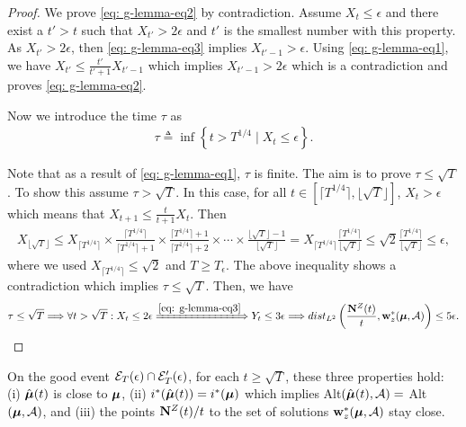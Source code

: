 \begin{proof}
        We prove \eqref{eq: g-lemma-eq2} by contradiction. Assume $X_t \leq \epsilon$ and there exist a $t' > t$ such that $X_{t'} > 2 \epsilon$ and $t'$ is the smallest number with this property. As $X_{t'} > 2 \epsilon$, then \eqref{eq: g-lemma-eq3} implies $X_{t'-1} > \epsilon$. Using \eqref{eq: g-lemma-eq1}, we have $X_{t'} \leq \frac{t'}{t'+1} X_{t'-1}$ which implies $X_{t'-1} > 2 \epsilon$ which is a contradiction and proves \eqref{eq: g-lemma-eq2}. 
    
        Now we introduce the time $\tau$ as 
        \begin{align*}
            \tau \triangleq \inf \left\{ t > T^{1/4} \mid X_t \leq \epsilon \right \}. 
        \end{align*}
    
        Note that as a result of \ref{eq: g-lemma-eq1}, $\tau$ is finite. The aim is to prove $\tau \leq \sqrt{T}$. To show this assume $\tau > \sqrt{T}$. In this case, for all $t \in [\lceil T^{1/4} \rceil , \lfloor \sqrt{T} \rfloor]$, $X_t > \epsilon$ which means that $X_{t+1} \leq \frac{t}{t+1} X_t$. Then 
        \begin{align*}
            X_{\lfloor \sqrt{T} \rfloor} \leq  X_{\lceil T^{1/4} \rceil} \times \frac{\lceil T^{1/4} \rceil}{\lceil T^{1/4} \rceil + 1} \times \frac{\lceil T^{1/4} \rceil + 1}{\lceil T^{1/4} \rceil + 2} \times \cdots \times \frac{\lfloor \sqrt{T} \rfloor - 1}{\lfloor \sqrt{T} \rfloor} = X_{\lceil T^{1/4} \rceil} \frac{\lceil T^{1/4} \rceil}{\lfloor \sqrt{T} \rfloor} \leq \sqrt{2} \frac{\lceil T^{1/4} \rceil}{\lfloor \sqrt{T} \rfloor} \leq \epsilon,
        \end{align*}
        where we used $X_{\lceil T^{1/4} \rceil} \leq \sqrt{2}$ and $T \geq T_{\epsilon}$. The above inequality shows a contradiction which implies $\tau \leq \sqrt{T}$. Then, we have
        \begin{align*}
            \tau \leq \sqrt{T} \Longrightarrow \forall t> \sqrt{T}: X_t \leq 2 \epsilon \xLongrightarrow{\eqref{eq: g-lemma-eq3}}  Y_t \leq 3 \epsilon \Longrightarrow \dls{\frac{\Nb^{Z}(t)}{t}} {\wzstar{\bmu}} \leq 5 \epsilon. 
        \end{align*}
    
    \end{proof}
    

    On the good event $\mathcal{E}_T(\epsilon) \cap \mathcal{E}'_T(\epsilon)$, for each $t \geq \sqrt{T}$, these three properties hold: (i) $\hat{\boldsymbol{\mu}}(t)$ is close to $\boldsymbol{\mu}$, (ii) $i^*(\hat{\boldsymbol{\mu}}(t)) = i^*(\boldsymbol{\mu})$ which implies Alt$(\hat{\boldsymbol{\mu}}(t), \mathcal{A}) = $ Alt$(\boldsymbol{\mu}, \mathcal{A})$, and (iii) the points $\mathbf{N}^{Z}(t)/t$ to the set of solutions $\mathbf{w}_z^*(\boldsymbol{\mu}, \mathcal{A})$ stay close.

